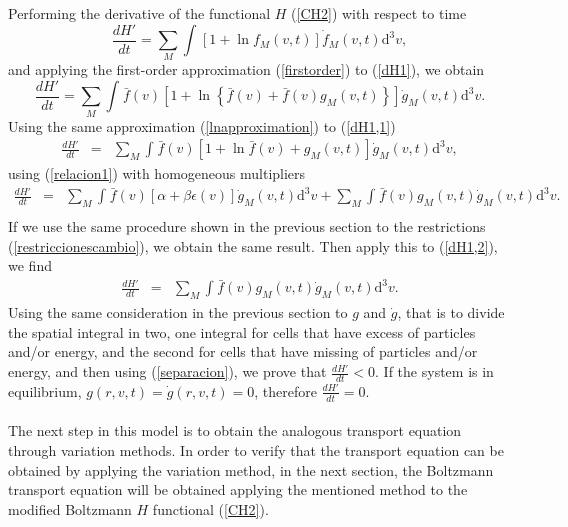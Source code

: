 \documentclass{article}
\begin{document}
Performing the derivative of the functional $H$ (\ref{CH2}) with respect to time
\begin{equation}
    \frac{dH'}{dt}=\sum_M\int_{}^{}\left[ 1+\ln f_M(v,t) \right]\dot f_M(v,t) \mathrm{d}^3v  \label{dH1},
\end{equation}{}
and applying the first-order approximation (\ref{firstorder}) to (\ref{dH1}), we obtain
\begin{equation}
    \frac{dH'}{dt}=\sum_M\int_{}^{}\bar f(v) \left [ 1+\ln \left\{ \bar f(v)+\bar f(v)g_M(v,t) \right\} \right]\dot g_M(v,t)\mathrm{d}^3v  \label{dH1,1}.
\end{equation}{}
Using the same approximation (\ref{lnapproximation})
to (\ref{dH1,1}) 
\begin{eqnarray}
\frac{dH'}{dt}&=&\sum_M \int_{}^{} \bar f(v)\left[ 1+\ln \bar f(v)+g_M(v,t) \right]\dot g_M(v,t)\mathrm{d}^3v,
\end{eqnarray}{}
using (\ref{relacion1}) with homogeneous multipliers
\begin{eqnarray}
\frac{dH'}{dt}&=&\sum_M\int_{}^{}\bar f(v)\left[ \alpha+\beta \epsilon(v) \right]\dot g_M(v,t)\mathrm{d}^3v +\sum_M\int_{}^{}\bar f(v)g_M(v,t)\dot g_M(v,t)\mathrm{d}^3v \label{dH1,2}. \nonumber \\
\end{eqnarray}{}
If we use the same procedure shown in the previous section to the restrictions (\ref{restriccionescambio}), we obtain the same result. Then apply this to (\ref{dH1,2}), we find
\begin{eqnarray}
\frac{dH'}{dt}&=&\sum_M\int_{}^{}\bar f(v)g_M(v,t)\dot g_M(v,t)\mathrm{d}^3v.
\end{eqnarray}{}
Using the same consideration in the previous section to $g$ and $\dot g$, that is to divide the spatial integral in two, one integral for cells that have excess of particles and/or energy, and the second for cells that have missing of particles and/or energy, and then using (\ref{separacion}), we prove that $\frac{dH'}{dt}<0$. If the system is in equilibrium, $g(r,v,t)=\dot g(r,v,t)=0$, therefore $\frac{dH'}{dt}=0$. 
\\
\\
The next step in this model is to obtain the analogous transport equation through variation methods. In order to verify that the transport equation can be obtained by applying the variation method, in the next section, the Boltzmann transport equation will be obtained applying the mentioned method to the modified Boltzmann $H$ functional (\ref{CH2}).
\end{document}
